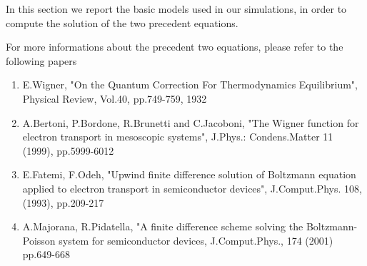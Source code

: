\documentclass[12pt]{book}
\begin{document}
In this section we report the basic models used in our simulations, in order to compute the solution of the two precedent equations.

For more informations about the precedent two equations, please refer to the following papers
\begin{enumerate}
\item
E.Wigner, "On the Quantum Correction For Thermodynamics Equilibrium", Physical Review, Vol.40, pp.749-759, 1932

\item
A.Bertoni, P.Bordone, R.Brunetti and C.Jacoboni, "The Wigner function for electron transport in mesoscopic systems", J.Phys.: Condens.Matter 11 (1999), pp.5999-6012

\item
E.Fatemi, F.Odeh, "Upwind finite difference solution of Boltzmann equation applied to electron transport in semiconductor devices", J.Comput.Phys. 108, (1993), pp.209-217

\item
A.Majorana, R.Pidatella, "A finite difference scheme solving the Boltzmann-Poisson system for semiconductor devices, J.Comput.Phys., 174 (2001) pp.649-668
\end{enumerate}
\end{document}
